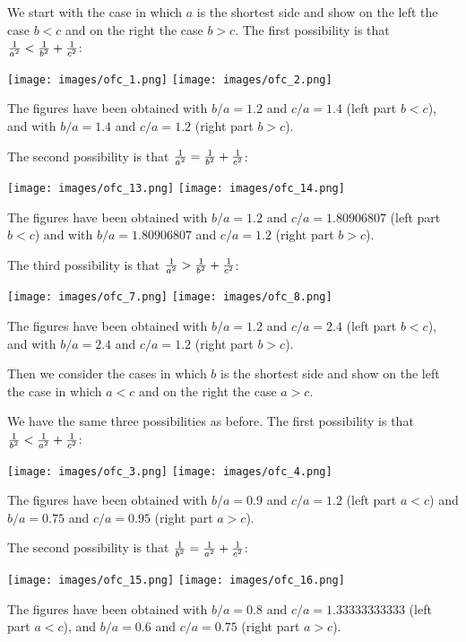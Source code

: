 \documentclass[12pt,a4paper]{article}
\begin{document}
We start with the case in which $a$ is the shortest side and show on the
left the case $b<c$ and on the right the case $b>c$. 
The first possibility is that ${1\over a^2} <
{1\over b^2} + {1\over c^2}$:
\begin{center}
\texttt{[image: images/ofc\_1.png]} \hspace{1cm}
\texttt{[image: images/ofc\_2.png]} 
\end{center}
The figures have been obtained with $b/a=1.2$ and $c/a=1.4$ (left part $b<c$),
and with $b/a=1.4$ and $c/a=1.2$ (right part $b>c$).

The second possibility is that ${1\over a^2} =
{1\over b^2} + {1\over c^2}$:
\begin{center}
\texttt{[image: images/ofc\_13.png]} \hspace{1cm}
\texttt{[image: images/ofc\_14.png]} 
\end{center}
The figures have been obtained with $b/a=1.2$ and $c/a=1.80906807$ 
(left part $b<c$) and with $b/a=1.80906807$ and $c/a=1.2$ (right part $b>c$).

The third possibility is that ${1 \over a^2} > {1\over b^2} + {1\over c^2}$:
\begin{center}
\texttt{[image: images/ofc\_7.png]} \hspace{1cm}
\texttt{[image: images/ofc\_8.png]} 
\end{center}
The figures have been obtained with $b/a=1.2$ and $c/a=2.4$ (left part $b<c$), 
and with $b/a=2.4$ and $c/a=1.2$ (right part $b>c$).

Then we consider the cases in which $b$ is the shortest side and show
on the left the case in which $a<c$ and on the right the case $a>c$. 

We have the same three possibilities as before. The first possibility
is that ${1 \over b^2} < {1\over a^2} + {1\over c^2}$: 
\begin{center}
\texttt{[image: images/ofc\_3.png]} \hspace{1cm}
\texttt{[image: images/ofc\_4.png]} \hspace{1cm}
\end{center}
The figures have been obtained with $b/a=0.9$ and $c/a=1.2$ 
(left part $a<c$) and $b/a=0.75$ and $c/a=0.95$ (right part $a>c$).

The second possibility is that ${1 \over b^2}={1\over a^2} + {1\over c^2}$:
\begin{center}
\texttt{[image: images/ofc\_15.png]} \hspace{1cm}
\texttt{[image: images/ofc\_16.png]} 
\end{center}
The figures have been obtained with $b/a=0.8$ and $c/a=1.33333333333$ (left
part $a<c$), and $b/a=0.6$ and $c/a=0.75$ (right part $a>c$).
\end{document}
